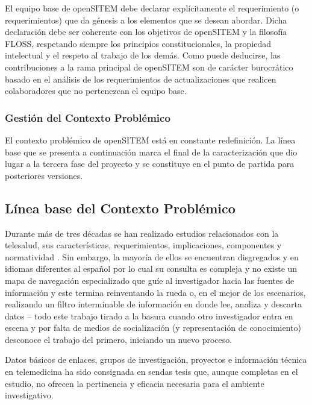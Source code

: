 El equipo base de openSITEM debe declarar explícitamente el requerimiento (o requerimientos) que da génesis a los elementos que se desean abordar. Dicha declaración debe ser coherente con los objetivos de openSITEM y la filosofía FLOSS, respetando siempre los principios constitucionales, la propiedad intelectual y el respeto al trabajo de los demás. Como puede deducirse, las contribuciones a la rama principal de openSITEM son de carácter burocrático basado en el análisis de los requerimientos de actualizaciones que realicen colaboradores que no pertenezcan el equipo base.

\subsubsection{Gestión del Contexto Problémico}

El contexto problémico de openSITEM está en constante redefinición. La línea base que se presenta a continuación marca el final de la caracterización que dio lugar a la tercera fase del proyecto y se constituye en el punto de partida para posteriores versiones.


\subsection{Línea base del Contexto Problémico}

Durante más de tres décadas se han realizado estudios relacionados con la telesalud, sus características, requerimientos, implicaciones, componentes y normatividad \cite{currie2014} \cite{aparicio2003} \cite{ross2016} \cite{bashshur95} \cite{oas2002} \cite{lewis2013}. Sin embargo, la mayoría de ellos se encuentran disgregados y en idiomas diferentes al español por lo cual su consulta es compleja y no existe un mapa de navegación especializado que guíe al investigador hacia las fuentes de información y este termina reinventando la rueda o, en el mejor de los escenarios, realizando un filtro interminable de información en donde lee, analiza y descarta datos – todo este trabajo tirado a la basura cuando otro investigador entra en escena y por falta de medios de socialización (y representación de conocimiento) desconoce el trabajo del primero, iniciando un nuevo proceso.









Datos básicos de enlaces, grupos de investigación, proyectos e información técnica en telemedicina ha sido consignada en sendas tesis que, aunque completas en el estudio, no ofrecen la pertinencia y eficacia necesaria para el ambiente investigativo. 

